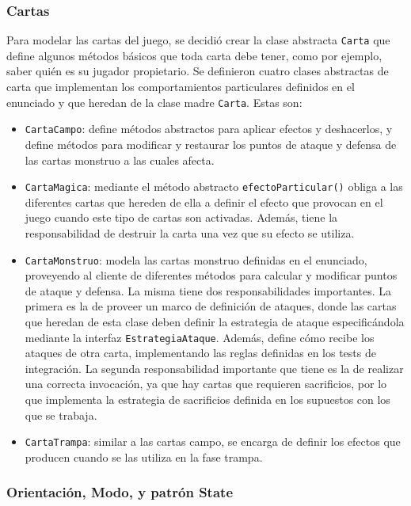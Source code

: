 	\subsubsection{Cartas}
	
	Para modelar las cartas del juego, se decidió crear la clase abstracta \texttt{Carta} que define algunos métodos básicos que toda carta debe tener, como por ejemplo, saber quién es su jugador propietario. Se definieron cuatro clases abstractas de carta que implementan los comportamientos particulares definidos en el enunciado y que heredan de la clase madre \texttt{Carta}. Estas son:
	\begin{itemize}
		\item \texttt{CartaCampo}: define métodos abstractos para aplicar efectos y deshacerlos, y define métodos para modificar y restaurar los puntos de ataque y defensa de las cartas monstruo a las cuales afecta.
		\item \texttt{CartaMagica}: mediante el método abstracto \texttt{efectoParticular()} obliga a las diferentes cartas que hereden de ella a definir el efecto que provocan en el juego cuando este tipo de cartas son activadas. Además, tiene la responsabilidad de destruir la carta una vez que su efecto se utiliza.
		\item \texttt{CartaMonstruo}: modela las cartas monstruo definidas en el enunciado, proveyendo al cliente de diferentes métodos para calcular y modificar puntos de ataque y defensa. La misma tiene dos responsabilidades importantes. La primera es la de proveer un marco de definición de ataques, donde las cartas que heredan de esta clase deben definir la estrategia de ataque especificándola mediante la interfaz \texttt{EstrategiaAtaque}. Además, define cómo recibe los ataques de otra carta, implementando las reglas definidas en los tests de integración. La segunda responsabilidad importante que tiene es la de realizar una correcta invocación, ya que hay cartas que requieren sacrificios, por lo que implementa la estrategia de sacrificios definida en los supuestos con los que se trabaja.
		\item \texttt{CartaTrampa}: similar a las cartas campo, se encarga de definir los efectos que producen cuando se las utiliza en la fase trampa.
	\end{itemize}
	
	
	
	\subsubsection{Orientación, Modo, y patrón State}
	
